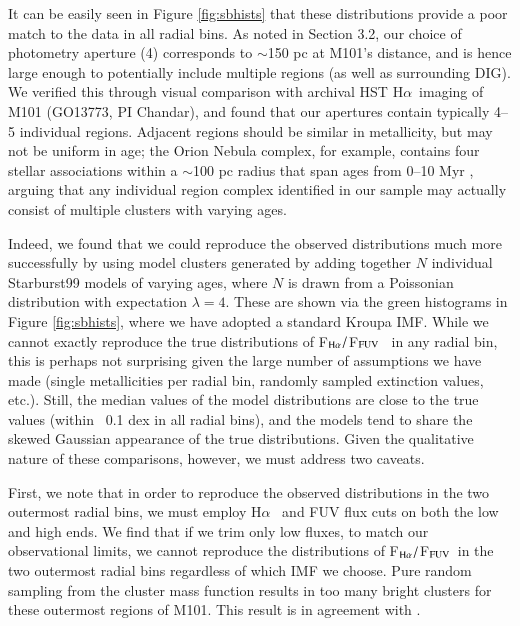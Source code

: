 \documentclass[iop]{emulateapj}
\newcommand{\ha}{H$\alpha$}
\newcommand{\hafuv}{F$_{\rm H\alpha}/$F$_{\rm FUV}$}
\begin{document}
It can be easily seen in Figure \ref{fig:sbhists} that these
distributions provide a poor match to the data in all radial bins.  As
noted in Section 3.2, our choice of photometry aperture (4)
corresponds to $\sim$150 pc at M101's distance, and is hence large
enough to potentially include multiple  regions (as well as
surrounding DIG).  We verified this through visual comparison with
archival HST \ha \ imaging of M101 (GO13773, PI Chandar), and found
that our apertures contain typically 4--5 individual 
regions.  Adjacent  regions should be similar in
metallicity, but may not be uniform in age; the Orion Nebula complex,
for example, contains four stellar associations within a $\sim$100 pc
radius that span ages from 0--10 Myr \citep{brown94}, arguing that any
individual  region complex identified in our sample may
actually consist of multiple clusters with varying ages.

Indeed, we found that we could reproduce the observed distributions
much more successfully by using model clusters generated by
  adding together $N$ individual Starburst99 models of varying ages,
  where $N$ is drawn from a Poissonian distribution with expectation
  $\lambda=4$.  These are shown via the green histograms in Figure
\ref{fig:sbhists}, where we have adopted a standard Kroupa IMF.
  While we cannot exactly reproduce the true distributions of \hafuv
  \ in any radial bin, this is perhaps not surprising given the large
  number of assumptions we have made (single metallicities per radial
  bin, randomly sampled extinction values, etc.).  Still, the median
  values of the model distributions are close to the true values
  (within ~0.1 dex in all radial bins), and the models tend to share
  the skewed Gaussian appearance of the true distributions.  Given the
  qualitative nature of these comparisons, however, we must address
  two caveats.

  First, we note that in order to reproduce the observed
    distributions in the two outermost radial bins, we must employ \ha
    \ and FUV flux cuts on both the low and high ends.  We find that
    if we trim only low fluxes, to match our observational limits, we
    cannot reproduce the distributions of \hafuv \ in the two
    outermost radial bins regardless of which IMF we choose.  Pure
    random sampling from the cluster mass function results in too many
    bright clusters for these outermost regions of M101.  This result
    is in agreement with \citet{pflamm13}.
\end{document}
